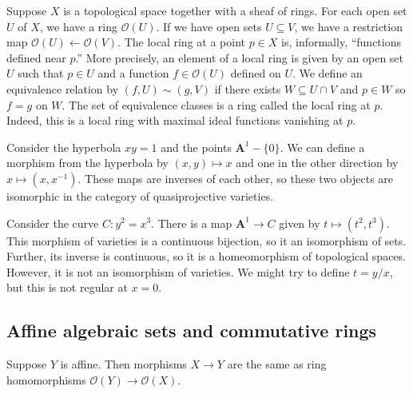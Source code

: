 \documentclass [11 pt, oneside, margin = 1 in] {article}
\begin{document}
Suppose $X$ is a topological space together with a sheaf of rings. For each open set $U$ of $X$, we have a ring $\mathscr{O}(U)$. If we have open sets $U\subseteq V$, we have a restriction map $\mathscr{O} (U)  \longleftarrow \mathscr{O}(V)$. The local ring at a point $p\in X$ is, informally, ``functions defined near $p$.'' More precisely, an element of a local ring is given by an open set $U$ such that $p\in U$ and a function $f\in \mathscr{O}(U)$ defined on $U$. We define an equivalence relation by $(f,U)\sim  (g,V)$ if there exists $W\subseteq U\cap V$ and $p\in W$  so $f=g$ on $W$. The set of equivalence classes is a ring called the local ring at $p$. Indeed, this is a local ring with maximal ideal functions vanishing at $p$.

\begin{example}[ ]\label{}\text{}
Consider the hyperbola $xy=1$ and the points $\mathbf{A}^1-\{0\}$. We can define a morphism from the hyperbola by $(x,y)\longmapsto x$ and one in the other direction by $x\longmapsto (x,x^{-1})$. These maps are inverses of each other, so these two objects are isomorphic in the category of quasiprojective varieties.
\end{example}

\begin{example}[ ]\label{}\text{}
Consider the curve $C: y^2=x^3$. There is a map $\mathbf{A}^1\longrightarrow C$ given by $t\longmapsto (t^2,t^3)$. This morphism of varieties is a continuous bijection, so it an isomorphism of sets. Further, its inverse is continuous, so it is a homeomorphism of topological spaces. However, it is not an isomorphism of varieties. We might try to define $t = y/x$, but this is not regular at $x=0$.
\end{example}

\subsection{Affine algebraic sets and commutative rings}
\begin{theorem}[ ]\label{}\index{}\text{}
Suppose $Y$ is affine. Then morphisms $X\longrightarrow Y$ are the same as ring homomorphisms $\mathscr{O}(Y)  \longrightarrow \mathscr{O}(X)$.
\end{theorem}
\end{document}
